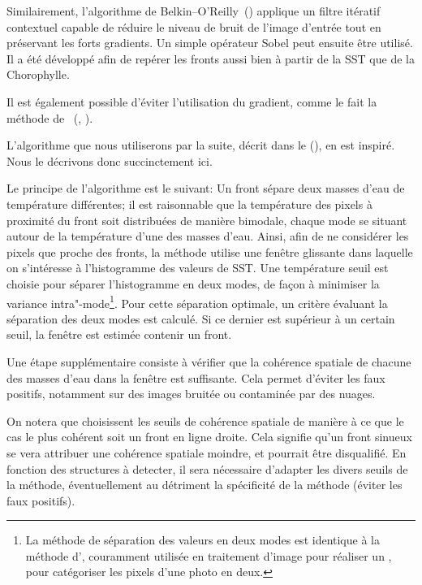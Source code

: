 Similairement, l'algorithme de Belkin--O'Reilly~(\cite{belkin_2009}) applique un filtre itératif contextuel capable de réduire le niveau de bruit de l'image d'entrée tout en préservant les forts gradients.
Un simple opérateur Sobel peut ensuite être utilisé.
Il a été développé afin de repérer les fronts aussi bien à partir de la SST que de la Chorophylle.

Il est également possible d'éviter l'utilisation du gradient, comme le fait la méthode de ~(, \cite{cayula_1992}).

\begin{technique}
L'algorithme que nous utiliserons par la suite, décrit dans le  (), en est inspiré. Nous le décrivons donc succinctement ici.

Le principe de l'algorithme  est le suivant: Un front sépare deux masses d'eau de température différentes; il est raisonnable que la température des pixels à proximité du front soit distribuées de manière bimodale, chaque mode se situant autour de la température d'une des masses d'eau.
Ainsi, afin de ne considérer les pixels que proche des fronts, la méthode utilise une fenêtre glissante dans laquelle on s'intéresse à l'histogramme des valeurs de SST.
Une température seuil est choisie pour séparer l'histogramme en deux modes, de façon à minimiser la variance intra"-mode\footnote{%
  La méthode de séparation des valeurs en deux modes est identique à la méthode d'\textcite{otsu_1979}, couramment utilisée en traitement d'image pour réaliser un ,  pour catégoriser les pixels d'une photo en deux.
}.
Pour cette séparation optimale, un critère évaluant la séparation des deux modes est calculé. Si ce dernier est supérieur à un certain seuil, la fenêtre est estimée contenir un front.

Une étape supplémentaire consiste à vérifier que la cohérence spatiale de chacune des masses d'eau dans la fenêtre est suffisante.
Cela permet d'éviter les faux positifs, notamment sur des images bruitée ou contaminée par des nuages.

  On notera que \textcite{cayula_1992} choisissent les seuils de cohérence spatiale de manière à ce que le cas le plus cohérent soit un front en ligne droite.
  Cela signifie qu'un front sinueux se vera attribuer une cohérence spatiale moindre, et pourrait être disqualifié.
  En fonction des structures à detecter, il sera nécessaire d'adapter les divers seuils de la méthode, éventuellement au détriment la spécificité de la méthode (éviter les faux positifs).

\end{technique}

